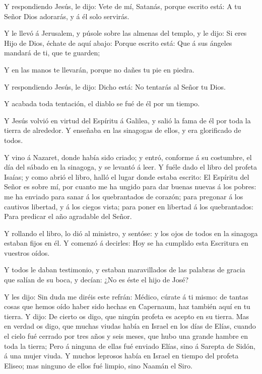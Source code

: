 Y respondiendo Jesús, le dijo: Vete de mí, Satanás, porque
escrito está: A tu Señor Dios adorarás, y á él solo servirás.

 Y le llevó á Jerusalem, y púsole sobre las almenas del
templo, y le dijo: Si eres Hijo de Dios, échate de aquí abajo:
 Porque escrito está: Que á sus ángeles mandará de ti, que
te guarden;

 Y en las manos te llevarán, porque no dañes tu pie en
piedra.

 Y respondiendo Jesús, le dijo: Dicho está: No tentarás al
Señor tu Dios.

 Y acabada toda tentación, el diablo se fué de él por un
tiempo.

 Y Jesús volvió en virtud del Espíritu á Galilea, y salió
la fama de él por toda la tierra de alrededor.  Y enseñaba
en las sinagogas de ellos, y era glorificado de todos.

 Y vino á Nazaret, donde había sido criado; y entró,
conforme á su costumbre, el día del sábado en la sinagoga, y se levantó
á leer.  Y fuéle dado el libro del profeta Isaías; y como
abrió el libro, halló el lugar donde estaba escrito:  El
Espíritu del Señor es sobre mí, por cuanto me ha ungido para dar buenas
nuevas á los pobres: me ha enviado para sanar á los quebrantados de
corazón; para pregonar á los cautivos libertad, y á los ciegos vista;
para poner en libertad á los quebrantados:  Para predicar
el año agradable del Señor.

 Y rollando el libro, lo dió al ministro, y sentóse: y los
ojos de todos en la sinagoga estaban fijos en él.  Y
comenzó á decirles: Hoy se ha cumplido esta Escritura en vuestros oídos.

 Y todos le daban testimonio, y estaban maravillados de las
palabras de gracia que salían de su boca, y decían: ¿No es éste el hijo
de José?

 Y les dijo: Sin duda me diréis este refrán: Médico, cúrate
á ti mismo: de tantas cosas que hemos oído haber sido hechas en
Capernaum, haz también aquí en tu tierra.  Y dijo: De
cierto os digo, que ningún profeta es acepto en su tierra. 
Mas en verdad os digo, que muchas viudas había en Israel en los días de
Elías, cuando el cielo fué cerrado por tres años y seis meses, que hubo
una grande hambre en toda la tierra;  Pero á ninguna de
ellas fué enviado Elías, sino á Sarepta de Sidón, á una mujer viuda.
 Y muchos leprosos había en Israel en tiempo del profeta
Eliseo; mas ninguno de ellos fué limpio, sino Naamán el Siro.

